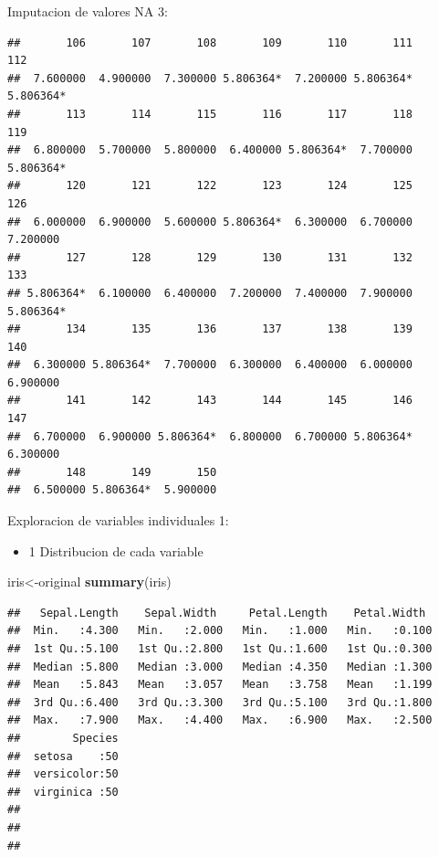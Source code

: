\documentclass[ignorenonframetext,]{beamer}
\newenvironment{Shaded}{\begin{snugshade}}{\end{snugshade}}
\newcommand{\KeywordTok}[1]{\textcolor[rgb]{0.13,0.29,0.53}{\textbf{#1}}}
\newcommand{\NormalTok}[1]{#1}
\providecommand{\tightlist}{%
  \setlength{\itemsep}{0pt}\setlength{\parskip}{0pt}}
\begin{document}
\begin{frame}[fragile]{Imputacion de valores NA 3:}
\begin{verbatim}
##       106       107       108       109       110       111       112 
##  7.600000  4.900000  7.300000 5.806364*  7.200000 5.806364* 5.806364* 
##       113       114       115       116       117       118       119 
##  6.800000  5.700000  5.800000  6.400000 5.806364*  7.700000 5.806364* 
##       120       121       122       123       124       125       126 
##  6.000000  6.900000  5.600000 5.806364*  6.300000  6.700000  7.200000 
##       127       128       129       130       131       132       133 
## 5.806364*  6.100000  6.400000  7.200000  7.400000  7.900000 5.806364* 
##       134       135       136       137       138       139       140 
##  6.300000 5.806364*  7.700000  6.300000  6.400000  6.000000  6.900000 
##       141       142       143       144       145       146       147 
##  6.700000  6.900000 5.806364*  6.800000  6.700000 5.806364*  6.300000 
##       148       149       150 
##  6.500000 5.806364*  5.900000
\end{verbatim}

\end{frame}

\begin{frame}[fragile]{Exploracion de variables individuales 1:}

\begin{itemize}
\tightlist
\item
  1 Distribucion de cada variable
\end{itemize}

\begin{Shaded}
\begin{Highlighting}[]
\NormalTok{iris<-original}
\KeywordTok{summary}\NormalTok{(iris)}
\end{Highlighting}
\end{Shaded}

\begin{verbatim}
##   Sepal.Length    Sepal.Width     Petal.Length    Petal.Width   
##  Min.   :4.300   Min.   :2.000   Min.   :1.000   Min.   :0.100  
##  1st Qu.:5.100   1st Qu.:2.800   1st Qu.:1.600   1st Qu.:0.300  
##  Median :5.800   Median :3.000   Median :4.350   Median :1.300  
##  Mean   :5.843   Mean   :3.057   Mean   :3.758   Mean   :1.199  
##  3rd Qu.:6.400   3rd Qu.:3.300   3rd Qu.:5.100   3rd Qu.:1.800  
##  Max.   :7.900   Max.   :4.400   Max.   :6.900   Max.   :2.500  
##        Species  
##  setosa    :50  
##  versicolor:50  
##  virginica :50  
##                 
##                 
## 
\end{verbatim}

\end{frame}
\end{document}
